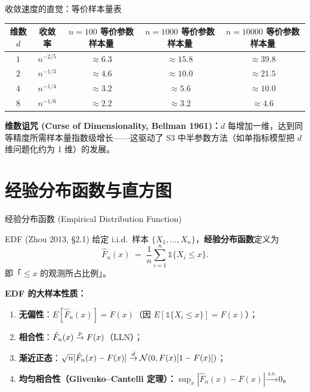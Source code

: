 \documentclass[aspectratio=169, 10pt]{beamer}
\renewcommand{\arraystretch}{1.05}
\begin{document}
\begin{frame}{收敛速度的直觉：等价样本量表}

  \centering\small
  \renewcommand{\arraystretch}{1.2}
  \begin{tabular}{@{}c|cccc@{}}
    \toprule
    维数 $d$ & 收敛率 & $n=100$ 等价参数样本量 & $n=1000$ 等价参数样本量 & $n=10000$ 等价参数样本量 \\
    \midrule
    $1$ & $n^{-2/5}$  & $\approx 6.3$  & $\approx 15.8$  & $\approx 39.8$ \\
    $2$ & $n^{-1/3}$  & $\approx 4.6$  & $\approx 10.0$  & $\approx 21.5$ \\
    $4$ & $n^{-1/4}$  & $\approx 3.2$  & $\approx 5.6$   & $\approx 10.0$ \\
    $8$ & $n^{-1/6}$  & $\approx 2.2$  & $\approx 3.2$   & $\approx 4.6$  \\
    \bottomrule
  \end{tabular}

  \begin{keybox}
    \textbf{维数诅咒 (Curse of Dimensionality, Bellman 1961)：}$d$ 每增加一维，达到同等精度所需样本量指数级增长——这驱动了 S3 中半参数方法（如单指标模型把 $d$ 维问题化约为 1 维）的发展。
  \end{keybox}

\end{frame}



\section{经验分布函数与直方图}

\begin{frame}{经验分布函数 (Empirical Distribution Function)}

  \begin{definitionbox}{{EDF (Zhou 2013, §2.1)}}
    给定 i.i.d.\ 样本 $\{X_1,\ldots,X_n\}$，\textbf{经验分布函数}定义为
    \[
      \hat F_n(x) \;=\; \frac{1}{n}\sum_{i=1}^n \mathds{1}\{X_i \leq x\}.
    \]
    即「$\leq x$ 的观测所占比例」。
  \end{definitionbox}

  \textbf{EDF 的大样本性质：}
  \begin{enumerate}
    \item \textbf{无偏性}：$E[\hat F_n(x)] = F(x)$（因 $E[\mathds{1}\{X_i\leq x\}]=F(x)$）；
    \item \textbf{相合性}：$\hat F_n(x) \overset{p}{\to} F(x)$（LLN）；
    \item \textbf{渐近正态}：$\sqrt{n}[\hat F_n(x)-F(x)] \overset{d}{\to} \mathcal{N}(0, F(x)[1-F(x)])$；
    \item \textbf{均匀相合性（Glivenko--Cantelli 定理）：}$\sup_{x}|\hat F_n(x)-F(x)| \overset{\text{a.s.}}{\to} 0$。
  \end{enumerate}

\end{frame}
\end{document}

